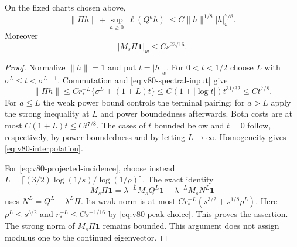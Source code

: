 \begin{lemma}
\label{lem:v80-interpolation}
On the fixed charts chosen above,
\begin{equation}\label{eq:v80-interpolation}
 \|\Pi h\|+\sup_{a\ge0}|\ell(Q^a h)|
                  \le C\|h\|^{1/8}|h|_w^{7/8}.
\end{equation}
Moreover
\begin{equation}\label{eq:v80-projected-incidence}
 |M_s\Pi\mathbf1|_w\le Cs^{23/16}.
\end{equation}
\end{lemma}
\begin{proof}
Normalize $\|h\|=1$ and put $t=|h|_w$. For $0<t<1/2$ choose
$L$ with $\sigma^L\le t<\sigma^{L-1}$. Commutation and
\eqref{eq:v80-spectral-input} give
\[
 \|\Pi h\|\le C r_*^{-L}\{\sigma^L+(1+L)t\}
             \le C(1+|\log t|)t^{31/32}\le Ct^{7/8}.
\]
For $a\le L$ the weak power bound controls the terminal pairing;
for $a>L$ apply the strong inequality at $L$ and power boundedness
afterwards. Both costs are at most $C(1+L)t\le Ct^{7/8}$.
The cases of $t$ bounded below and $t=0$ follow, respectively, by
power boundedness and by letting $L\to\infty$. Homogeneity gives
\eqref{eq:v80-interpolation}.

For \eqref{eq:v80-projected-incidence}, choose instead
$L=\lceil(3/2)\log(1/s)/\log(1/\rho)\rceil$. The exact identity
\[
 M_s\Pi\mathbf1
    =\lambda^{-L}M_sQ^L\mathbf1-\lambda^{-L}M_sN^L\mathbf1
\]
uses $N^L=Q^L-\lambda^L\Pi$. Its weak norm is at most
$Cr_*^{-L}(s^{3/2}+s^{1/8}\rho^L)$.
Here $\rho^L\le s^{3/2}$ and
$r_*^{-L}\le Cs^{-1/16}$ by \eqref{eq:v80-peak-choice}. This proves
the assertion. The strong norm of $M_s\Pi\mathbf1$ remains bounded.
This argument does not assign modulus one to the continued eigenvector.
\end{proof}

